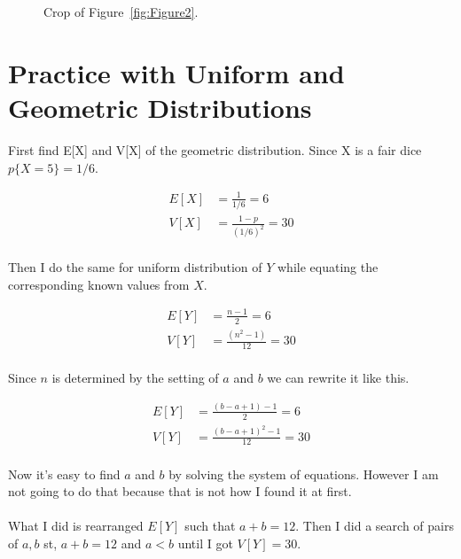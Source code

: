 \documentclass[twocolumn]{article}
\begin{document}
\begin{figure}[H]
    \centering
    \caption{Crop of Figure~\ref{fig:Figure2}.}
\end{figure}

\pagebreak
\raggedbottom
\section{Practice with Uniform and Geometric Distributions}

First find E[X] and V[X] of the geometric distribution. Since X is a fair dice $p\{X=5\}= 1/6$.

\vspace{-10pt}
\begin{align*}
E[X] &= \frac{1}{1/6} = 6 \\
V[X] &= \frac{1-p}{(1/6)^2} = 30 \\
\end{align*}

\vspace{-20pt}
Then I do the same for uniform distribution of $Y$ while equating the corresponding known values from $X$.

\vspace{-25pt}
\begin{align*}
E[Y] &= \frac{n-1}{2} = 6 \\
V[Y] &= \frac{(n^2-1)}{12} = 30 \\
\end{align*}

\vspace{-18pt}
Since $n$ is determined by the setting of $a$ and $b$ we can rewrite it like this.

\vspace{-10pt}
\begin{align*}
E[Y] &= \frac{(b-a+1)-1}{2} = 6 \\
V[Y] &= \frac{(b-a+1)^2-1}{12} = 30 \\
\end{align*}

\vspace{-20pt}
Now it's easy to find $a$ and $b$ by solving the system of equations. However I am not going to do that because that is not how I found it at first. \\
\vspace{-10pt}
\\
What I did is rearranged $E[Y]$ such that $a+b=12$. Then I did a search of pairs of $a,b$ st, $a+b=12$ and $a<b$ until I got $V[Y]=30$.  
\end{document}
